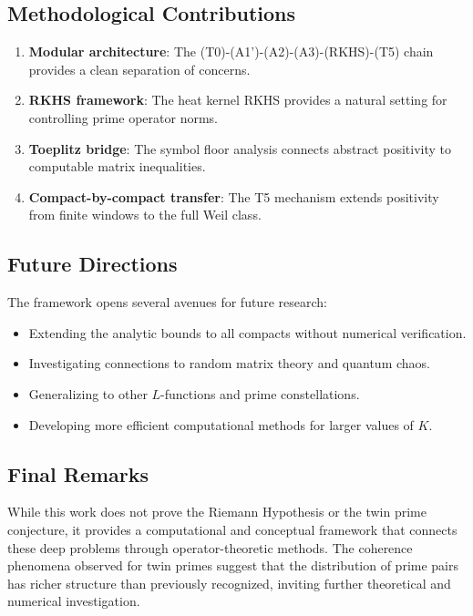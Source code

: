 \subsection{Methodological Contributions}

\begin{enumerate}
  \item \textbf{Modular architecture}: The (T0)-(A1')-(A2)-(A3)-(RKHS)-(T5) chain provides a clean separation of concerns.

  \item \textbf{RKHS framework}: The heat kernel RKHS provides a natural setting for controlling prime operator norms.

  \item \textbf{Toeplitz bridge}: The symbol floor analysis connects abstract positivity to computable matrix inequalities.

  \item \textbf{Compact-by-compact transfer}: The T5 mechanism extends positivity from finite windows to the full Weil class.
\end{enumerate}

\subsection{Future Directions}

The framework opens several avenues for future research:

\begin{itemize}
  \item Extending the analytic bounds to all compacts without numerical verification.
  \item Investigating connections to random matrix theory and quantum chaos.
  \item Generalizing to other $L$-functions and prime constellations.
  \item Developing more efficient computational methods for larger values of $K$.
\end{itemize}

\subsection{Final Remarks}

While this work does not prove the Riemann Hypothesis or the twin prime conjecture, it provides a computational and conceptual framework that connects these deep problems through operator-theoretic methods. The coherence phenomena observed for twin primes suggest that the distribution of prime pairs has richer structure than previously recognized, inviting further theoretical and numerical investigation.

